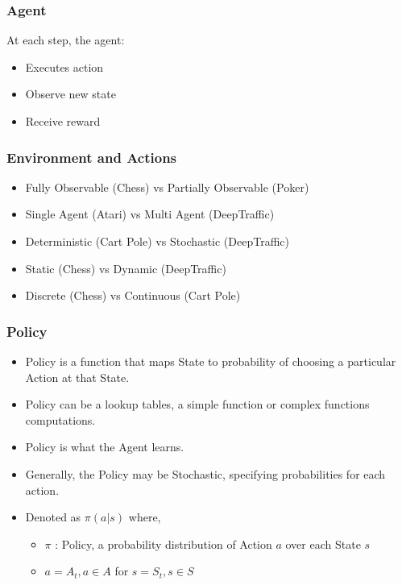 \begin{frame}[fragile]\frametitle{Agent}

At each step, the agent:
\begin{itemize}
\item Executes action
\item Observe new state
\item Receive reward
\end{itemize}

\end{frame}

\begin{frame}[fragile]\frametitle{Environment and Actions}

\begin{itemize}
\item Fully Observable (Chess) vs Partially Observable (Poker)
\item Single Agent (Atari) vs Multi Agent (DeepTraffic)
\item Deterministic (Cart Pole) vs Stochastic (DeepTraffic)
\item Static (Chess) vs Dynamic (DeepTraffic)
\item Discrete (Chess) vs Continuous (Cart Pole)

\end{itemize}

\end{frame}



\begin{frame}[fragile]\frametitle{Policy}

\begin{itemize}
\item Policy is a function that maps State to probability of choosing a particular Action at that State.
\item Policy can be a lookup tables, a simple function or complex functions computations.
\item Policy is what the Agent learns.
\item Generally, the Policy may be Stochastic, specifying probabilities for each action.
\item Denoted as $\pi (a|s)$ where,
	\begin{itemize}
	\item $\pi$ : Policy, a probability distribution of Action $a$ over each State $s$
	\item $a = A_t, a \in A$ for $s = S_t, s \in S$
	\end{itemize}

\end{itemize}

\end{frame}



